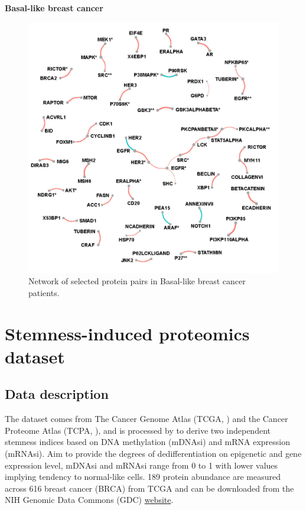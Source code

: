 \documentclass[
]{book}
\begin{document}
\textbf{Basal-like breast cancer}

\begin{figure}

{\centering \includegraphics[width=0.7\linewidth]{images/subtype_fullnet_basal} 

}

\caption{Network of selected protein pairs in Basal-like breast cancer patients.}\label{fig:basalfullnet}
\end{figure}

\hypertarget{StemnessBC}{%
\chapter{Stemness-induced proteomics dataset}\label{StemnessBC}}

\hypertarget{StemnessBCdata}{%
\section{Data description}\label{StemnessBCdata}}

The dataset comes from The Cancer Genome Atlas (TCGA, \citet{weinstein2013cancer}) and the Cancer Proteome Atlas (TCPA, \citet{li2013tcpa}), and is processed by \citet{malta2018machine} to derive two independent stemness indices based on DNA methylation (mDNAsi) and mRNA expression (mRNAsi). Aim to provide the degrees of dedifferentiation on epigenetic and gene expression level, mDNAsi and mRNAsi range from 0 to 1 with lower values implying tendency to normal-like cells. 189 protein abundance are measured across 616 breast cancer (BRCA) from TCGA \citep{weinstein2013cancer} and can be downloaded from the NIH Genomic Data Commons (GDC) \href{https://gdc.cancer.gov/about-data/publications/PanCanStemness-2018}{website}.
\end{document}
